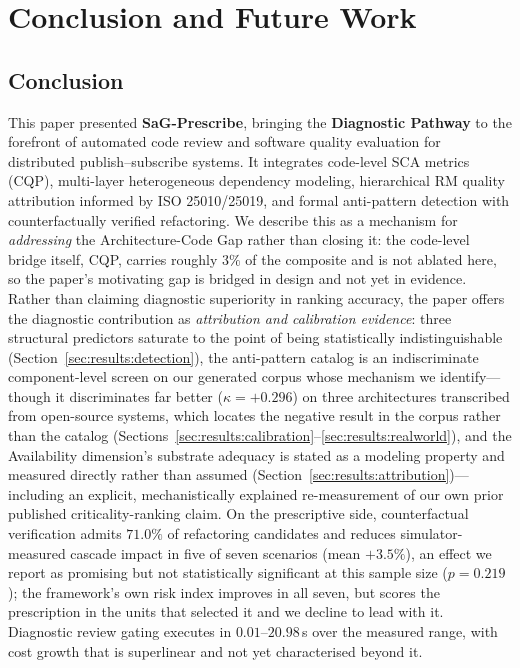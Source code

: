 \section{Conclusion and Future Work}
\label{sec:conclusion}

\subsection{Conclusion}
\label{sec:conclusion:summary}

This paper presented \textbf{SaG-Prescribe}, bringing the \textbf{Diagnostic Pathway} to the forefront of automated code review and software quality evaluation for distributed publish--subscribe systems. It integrates code-level SCA metrics (CQP), multi-layer heterogeneous dependency modeling, hierarchical RM quality attribution informed by ISO 25010/25019, and formal anti-pattern detection with counterfactually verified refactoring. We describe this as a mechanism for \emph{addressing} the Architecture-Code Gap rather than closing it: the code-level bridge itself, CQP, carries roughly $3\%$ of the composite and is not ablated here, so the paper's motivating gap is bridged in design and not yet in evidence. Rather than claiming diagnostic superiority in ranking accuracy, the paper offers the diagnostic contribution as \emph{attribution and calibration evidence}: three structural predictors saturate to the point of being statistically indistinguishable (Section~\ref{sec:results:detection}), the anti-pattern catalog is an indiscriminate component-level screen on our generated corpus whose mechanism we identify---though it discriminates far better ($\kappa = +0.296$) on three architectures transcribed from open-source systems, which locates the negative result in the corpus rather than the catalog (Sections~\ref{sec:results:calibration}--\ref{sec:results:realworld}), and the Availability dimension's substrate adequacy is stated as a modeling property and measured directly rather than assumed (Section~\ref{sec:results:attribution})---including an explicit, mechanistically explained re-measurement of our own prior published criticality-ranking claim. On the prescriptive side, counterfactual verification admits $71.0\%$ of refactoring candidates and reduces simulator-measured cascade impact in five of seven scenarios (mean $+3.5\%$), an effect we report as promising but not statistically significant at this sample size ($p = 0.219$); the framework's own risk index improves in all seven, but scores the prescription in the units that selected it and we decline to lead with it. Diagnostic review gating executes in $0.01$--$20.98$\,s over the measured range, with cost growth that is superlinear and not yet characterised beyond it.

